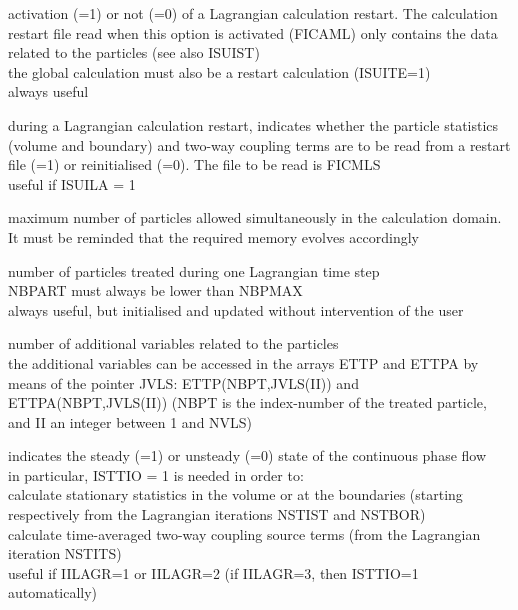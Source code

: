 {activation (=1) or not (=0) of a Lagrangian calculation restart.
The calculation restart file read when this option is activated (FICAML)
only contains the data related to the particles (see also ISUIST)\\
the global calculation must also be a restart calculation (ISUITE=1)\\
always useful}

{during a Lagrangian calculation restart, indicates whether the particle
statistics (volume and boundary) and two-way coupling terms are to be read from
a restart file (=1) or reinitialised (=0). The file to be read is FICMLS\\
useful if ISUILA = 1}

{maximum number of particles allowed simultaneously in the calculation
domain. It must be reminded that the required memory evolves accordingly}

{number of particles treated during one Lagrangian time step\\
NBPART must always be lower than NBPMAX\\
always useful, but initialised and updated without intervention of the user}

{number of additional variables related to the particles\\
the additional variables can be accessed in the arrays
ETTP and ETTPA by means of the pointer
JVLS: ETTP(NBPT,JVLS(II)) and ETTPA(NBPT,JVLS(II)) (NBPT is
the index-number of the treated particle, and II an integer between 1 and NVLS)}

{indicates the steady (=1) or unsteady (=0) state of the
continuous phase flow\\
in particular, ISTTIO = 1 is needed in order to: \\
\hspace*{1cm}calculate stationary statistics in the volume or at the boundaries
(starting respectively from the Lagrangian iterations NSTIST and NSTBOR) \\
\hspace*{1cm}calculate time-averaged two-way coupling source terms (from the
Lagrangian iteration NSTITS) \\
useful if IILAGR=1 or IILAGR=2 (if IILAGR=3, then ISTTIO=1 automatically)}

